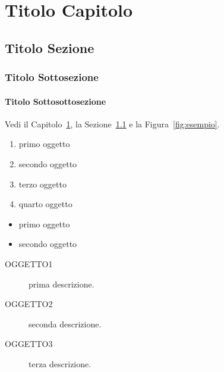 
\chapter{Titolo Capitolo}
\label{chap:capitolo}

\section{Titolo Sezione}
\label{sec:sezione}

\subsection{Titolo Sottosezione}
\label{subsec:sottosezione}

\subsubsection{Titolo Sottosottosezione}
\label{subsubsec:tema}

Vedi il Capitolo~\ref{chap:capitolo}, la Sezione~\ref{sec:sezione}
e la Figura~\ref{fig:esempio}.

\begin{enumerate}
\item primo oggetto
\item secondo oggetto
\item terzo oggetto
\item quarto oggetto
\end{enumerate}

\begin{itemize}
\item primo oggetto
\item secondo oggetto
\end{itemize}

\begin{description}
\item[OGGETTO1] prima descrizione.
\item[OGGETTO2] seconda descrizione.
\item[OGGETTO3] terza descrizione.
\end{description}

